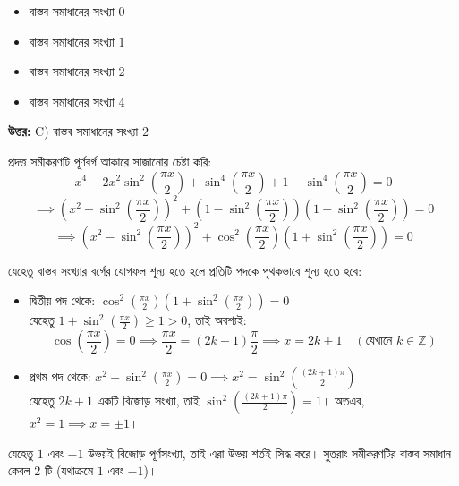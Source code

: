 \documentclass[12pt, a4paper]{article}
\begin{document}
\begin{itemize}[label={}, leftmargin=1cm, itemsep=0.5em]
    \item[\textbf{A)}] বাস্তব সমাধানের সংখ্যা $0$
    \item[\textbf{B)}] বাস্তব সমাধানের সংখ্যা $1$
    \item[\textbf{C)}] বাস্তব সমাধানের সংখ্যা $2$
    \item[\textbf{D)}] বাস্তব সমাধানের সংখ্যা $4$
\end{itemize}

\vspace{0.5em}
\begin{tcolorbox}[answerbox]
    \textbf{\color{success} উত্তর:} C) বাস্তব সমাধানের সংখ্যা $2$
\end{tcolorbox}
\vspace{1em}

\begin{tcolorbox}[solutionbox={সমাধান (Solution)}]
    \noindent
    প্রদত্ত সমীকরণটি পূর্ণবর্গ আকারে সাজানোর চেষ্টা করি:
    \[ x^4 - 2x^2 \sin^2\left(\frac{\pi x}{2}\right) + \sin^4\left(\frac{\pi x}{2}\right) + 1 - \sin^4\left(\frac{\pi x}{2}\right) = 0 \]
    \[ \implies \left(x^2 - \sin^2\left(\frac{\pi x}{2}\right)\right)^2 + (1 - \sin^2\left(\frac{\pi x}{2}\right))(1 + \sin^2\left(\frac{\pi x}{2}\right)) = 0 \]
    \[ \implies \left(x^2 - \sin^2\left(\frac{\pi x}{2}\right)\right)^2 + \cos^2\left(\frac{\pi x}{2}\right) (1 + \sin^2\left(\frac{\pi x}{2}\right)) = 0 \]
    
    \vspace{0.5em}
    যেহেতু বাস্তব সংখ্যার বর্গের যোগফল শূন্য হতে হলে প্রতিটি পদকে পৃথকভাবে শূন্য হতে হবে:
    \begin{itemize}[itemsep=0.4em]
        \item দ্বিতীয় পদ থেকে: $\cos^2\left(\frac{\pi x}{2}\right) (1 + \sin^2\left(\frac{\pi x}{2}\right)) = 0$ \\
        যেহেতু $1 + \sin^2\left(\frac{\pi x}{2}\right) \ge 1 > 0$, তাই অবশ্যই:
        \[ \cos\left(\frac{\pi x}{2}\right) = 0 \implies \frac{\pi x}{2} = (2k+1)\frac{\pi}{2} \implies x = 2k+1 \quad (\text{যেখানে } k \in \mathbb{Z}) \]
        
        \item প্রথম পদ থেকে: $x^2 - \sin^2\left(\frac{\pi x}{2}\right) = 0 \implies x^2 = \sin^2\left(\frac{(2k+1)\pi}{2}\right)$ \\
        যেহেতু $2k+1$ একটি বিজোড় সংখ্যা, তাই $\sin^2\left(\frac{(2k+1)\pi}{2}\right) = 1$। 
        অতএব, $x^2 = 1 \implies x = \pm 1$।
    \end{itemize}
    যেহেতু $1$ এবং $-1$ উভয়ই বিজোড় পূর্ণসংখ্যা, তাই এরা উভয় শর্তই সিদ্ধ করে। 
    সুতরাং সমীকরণটির বাস্তব সমাধান কেবল $2$ টি (যথাক্রমে $1$ এবং $-1$)।
\end{tcolorbox}
\end{document}
